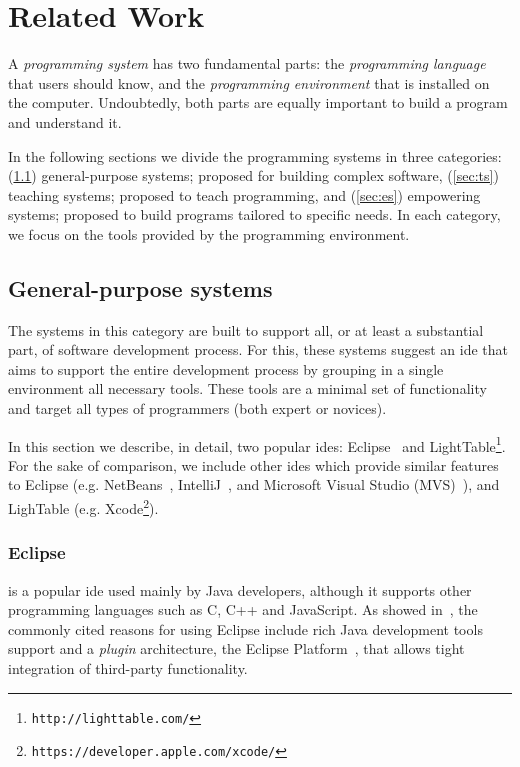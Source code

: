
% 
% 

\section{Related Work}
\label{sec:rw}
A \textit{programming system} has two fundamental parts: the \textit{programming language} that users should know, and the \textit{programming environment} that is installed on the computer. Undoubtedly, both parts are equally important to build a program and understand it.

In the following sections we divide the programming systems in three categories: (\ref{sec:gs}) general-purpose systems; proposed for building complex software, (\ref{sec:ts}) teaching systems; proposed to teach programming, and (\ref{sec:es}) empowering systems; proposed to build programs tailored to specific needs. In each category, we focus on the tools provided by the programming environment.
\subsection{General-purpose systems}
\label{sec:gs}

The systems in this category are built to support all, or at least a substantial part, of software development process. For this, these systems suggest an \ac{ide} that aims to support the entire development process by grouping in a single environment all necessary tools. These tools are a minimal set of functionality and target all types of programmers (both expert or novices).

In this section we describe, in detail, two popular \ac{ide}s: Eclipse~\cite{carlson2005eclipse} and LightTable\footnote{\texttt{http://lighttable.com/}}. For the sake of comparison, we include other \ac{ide}s which provide similar features to Eclipse (e.g. NetBeans~\cite{boudreau2002netbeans}, IntelliJ~\cite{intellij2001intellij}, and Microsoft Visual Studio (MVS)~\cite{guckenheimer2006software}), and LighTable (e.g. Xcode\footnote{\texttt{https://developer.apple.com/xcode/}}).
\subsubsection{Eclipse~\cite{carlson2005eclipse}} is a popular \ac{ide} used mainly by Java developers, although it supports other programming languages such as C, C++ and JavaScript. As showed in~\cite{murphy2006java}, the commonly cited reasons for using Eclipse include rich Java development tools support and a \textit{plugin} architecture, the Eclipse Platform~\cite{DesRivieres2004}, that allows tight integration of third-party functionality.

